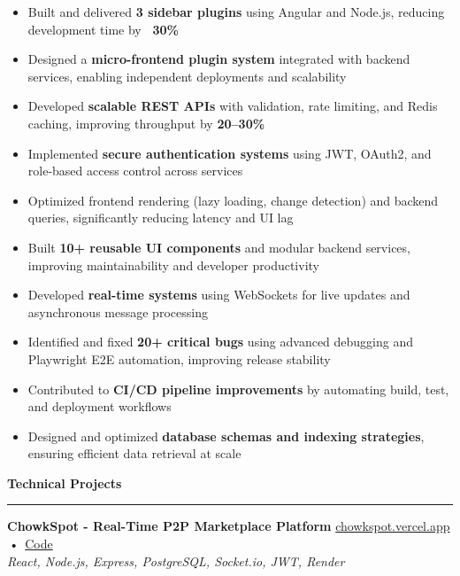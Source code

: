 \documentclass[10pt, letterpaper]{article}
\newcommand{\resumesection}[1]{
\vspace{6pt}
{\normalsize \textbf{\textcolor{accent}{#1}}}
\vspace{2pt}
\hrule
\vspace{3pt}
}
\newcommand{\project}[4]{
\vspace{2pt}
\textbf{#1} \hfill \href{#3}{\faIcon{globe} chowkspot.vercel.app} \,•\,
\href{#4}{\faIcon{github} Code} \\ \textit{\small #2}
\vspace{2pt}
}
\begin{document}
	\begin{itemize}
		\item Built and delivered \textbf{3 sidebar plugins} using Angular and Node.js,
			reducing development time by \textbf{~30\%}

		\item Designed a \textbf{micro-frontend plugin system} integrated with
			backend services, enabling independent deployments and scalability

		\item Developed \textbf{scalable REST APIs} with validation, rate limiting,
			and Redis caching, improving throughput by \textbf{20--30\%}

		\item Implemented \textbf{secure authentication systems} using JWT, OAuth2,
			and role-based access control across services

		\item Optimized frontend rendering (lazy loading, change detection) and
			backend queries, significantly reducing latency and UI lag

		\item Built \textbf{10+ reusable UI components} and modular backend services,
			improving maintainability and developer productivity

		\item Developed \textbf{real-time systems} using WebSockets for live updates
			and asynchronous message processing

		\item Identified and fixed \textbf{20+ critical bugs} using advanced
			debugging and Playwright E2E automation, improving release stability

		\item Contributed to \textbf{CI/CD pipeline improvements} by automating
			build, test, and deployment workflows

		\item Designed and optimized \textbf{database schemas and indexing
			strategies}, ensuring efficient data retrieval at scale
	\end{itemize}

	\resumesection{Technical Projects}

	\project{ChowkSpot - Real-Time P2P Marketplace Platform}
	{React, Node.js, Express, PostgreSQL, Socket.io, JWT, Render}
	{https://chowkspot.vercel.app/} {https://github.com/SharadJ19/chowkspot}
\end{document}
